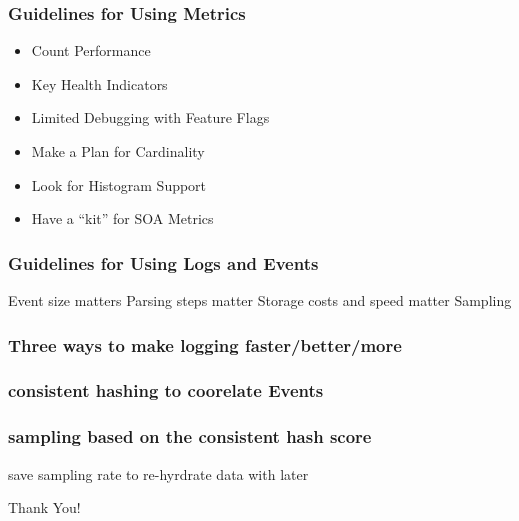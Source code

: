 \begin{frame}
    \frametitle{Guidelines for Using Metrics}

    \begin{itemize}
        \item Count Performance
        \item Key Health Indicators
        \item Limited Debugging with Feature Flags
        \item Make a Plan for Cardinality
        \item Look for Histogram Support
        \item Have a ``kit'' for SOA Metrics
    \end{itemize}
\end{frame}

\begin{frame}
    \frametitle{Guidelines for Using Logs and Events}
    Event size matters
    Parsing steps matter
    Storage costs and speed matter
    Sampling
\end{frame}

\begin{frame}
    \frametitle{Three ways to make logging faster/better/more}
\end{frame}
\begin{frame}
    \frametitle{consistent hashing to coorelate Events}
\end{frame}

\begin{frame}
    \frametitle{sampling based on the consistent hash score}
\end{frame}

\begin{frame}
               save sampling rate to re-hyrdrate data with later
\end{frame}


    




\begin{frame}[standout]
    Thank You!
\end{frame}

\appendix



